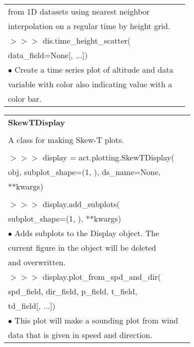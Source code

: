 \documentclass[potrait, z1paper, fontscale=0.33]{baposter} %
\begin{document}
\begin{poster}
{\begin{flushleft}
\begin{tabular}{@{}ll@{}}
\-\hspace{0.5cm} from 1D datasets using nearest neighbor\\
\-\hspace{0.5cm} interpolation on a regular time by height grid.\\
$>$$>$$>$ dis.time\_height\_scatter(\\
\-\hspace{1.2cm} data\_field=None[, ...])\\
\-\hspace{0.2cm} $\bullet$ Create a time series plot of altitude and data\\
\-\hspace{0.5cm} variable with color also indicating value with a\\
\-\hspace{0.5cm} color bar.\\
\end{tabular}

\begin{tabular}{@{}ll@{}}
\\
\multicolumn{2}{l}{\cellcolor[HTML]{DDFFFF}\bf SkewTDisplay} \\
\\
A class for making Skew-T plots.\\
\\
$>$$>$$>$ display = act.plotting.SkewTDisplay(\\
\-\hspace{1.2cm} obj, subplot\_shape=(1, ), ds\_name=None,\\
\-\hspace{1.2cm} **kwargs)\\
\\
$>$$>$$>$ display.add\_subplots(\\
\-\hspace{1.2cm} subplot\_shape=(1, ), **kwargs)\\
\-\hspace{0.2cm} $\bullet$ Adds subplots to the Display object. The\\
\-\hspace{0.5cm} current figure in the object will be deleted\\
\-\hspace{0.5cm} and overwritten.\\
$>$$>$$>$ display.plot\_from\_spd\_and\_dir(\\
\-\hspace{1.2cm} spd\_field, dir\_field, p\_field, t\_field,\\
\-\hspace{1.2cm} td\_field[, ...])\\
\-\hspace{0.2cm} $\bullet$ This plot will make a sounding plot from wind\\
\-\hspace{0.5cm} data that is given in speed and direction.\\


\end{tabular}
\end{flushleft}}
\end{poster}
\end{document}
